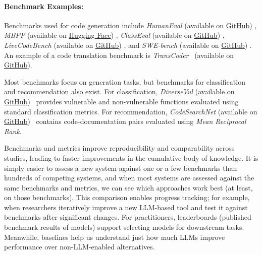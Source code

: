 \paragraph{Benchmark Examples:}

Benchmarks used for code generation include \emph{HumanEval} (available on \href{https://github.com/openai/human-eval}{GitHub}) \cite{DBLP:journals/corr/abs-2107-03374}, \emph{MBPP} (available on \href{https://huggingface.co/datasets/google-research-datasets/mbpp}{Hugging Face}) \cite{DBLP:journals/corr/abs-2108-07732},
\emph{ClassEval} (available on \href{https://github.com/FudanSELab/ClassEval}{GitHub}) \cite{DBLP:journals/corr/abs-2308-01861}, \emph{LiveCodeBench} (available on \href{https://github.com/LiveCodeBench/LiveCodeBench}{GitHub}) \cite{DBLP:journals/corr/abs-2403-07974}, and \emph{SWE-bench} (available on \href{https://github.com/swe-bench/SWE-bench}{GitHub}) \cite{DBLP:conf/iclr/JimenezYWYPPN24}.
An example of a code translation benchmark is \emph{TransCoder}~\cite{DBLP:journals/corr/abs-2006-03511} (available on \href{https://github.com/facebookresearch/CodeGen}{GitHub}). 

Most benchmarks focus on generation tasks, but benchmarks for classification and recommendation also exist.
For classification, \emph{DiverseVul} (available on \href{https://github.com/wagner-group/diversevul}{GitHub})~\cite{DBLP:conf/raid/0001DACW23} provides vulnerable and non-vulnerable functions evaluated using standard classification metrics.
For recommendation, \emph{CodeSearchNet} (available on \href{https://github.com/github/CodeSearchNet}{GitHub})~\cite{DBLP:journals/corr/abs-1909-09436} contains code-documentation pairs evaluated using \emph{Mean Reciprocal Rank}.


Benchmarks and metrics improve reproducibility and comparability across studies, leading to faster improvements in the cumulative body of knowledge. It is simply easier to assess a new system against one or a few benchmarks than hundreds of competing systems, and when most systems are assessed against the same benchmarks and metrics, we can see which approaches work best (at least, on those benchmarks). This comparison enables progress tracking; for example, when researchers iteratively improve a new LLM-based tool and test it against benchmarks after significant changes. For practitioners, leaderboards (published benchmark results of models) support selecting models for downstream tasks. Meanwhile, baselines help us understand just how much LLMs improve performance over non-LLM-enabled alternatives. 

